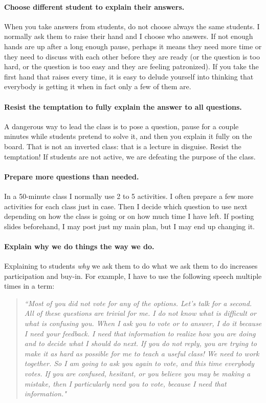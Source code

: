 \documentclass[11pt]{article}
\begin{document}
	\paragraph{Choose different student to explain their answers.}  When you take answers from students, do not choose always the same students.  I normally ask them to raise their hand and I choose who answers.  If not enough hands are up after a long enough pause, perhaps it means they need more time or they need to discuss with each other before they are ready (or the question is too hard, or the question is too easy and they are feeling patronized).  If you take the first hand that raises every time, it is easy to delude yourself into thinking that everybody is getting it when in fact only a few of them are.
	\paragraph{Resist the temptation to fully explain the answer to all questions.}  A dangerous way to lead the class is to pose a question, pause for a couple minutes while students pretend to solve it, and then you explain it fully on the board.   That is not an inverted class: that is a lecture in disguise.  Resist the temptation!  If students are not active, we are defeating the purpose of the class.
	\paragraph{Prepare more questions than needed.} In a 50-minute class I normally use 2 to 5 activities.  I often prepare a few more activities for each class just in case.  Then I decide which question to use next depending on how the class is going or on how much time I have left.  If posting slides beforehand, I may post just my main plan, but I may end up changing it.  
	
	\paragraph{Explain why we do things the way we do.} Explaining to students \emph{why} we ask them to do what we ask them to do increases participation and buy-in.  For example, I have to use the following speech multiple times in a term:
	
		\begin{quote}
		\emph{``Most of you did not vote for any of the options.  Let's talk for a second.  All of these questions are trivial for me.  I do not know what is difficult or what is confusing you.  When I ask you to vote or to answer, I do it because I need your feedback.  I need that information to realize how you are doing and to decide what I should do next.  If you do not reply, you are trying to make it as hard as possible for me to teach a useful class!  We need to work together.  So I am going to ask you again to vote, and this time everybody votes.  If you are confused, hesitant, or you believe you may be making a mistake, then I particularly need you to vote, because I need that information."}
		\end{quote}
\end{document}
